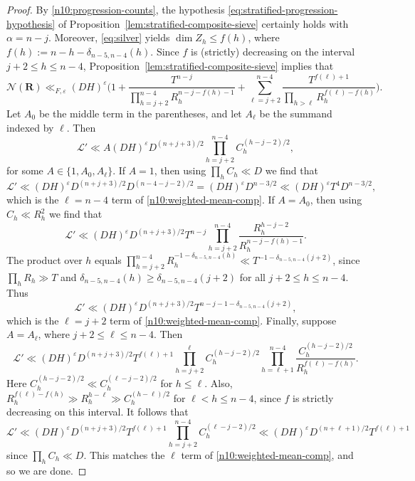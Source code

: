 \documentclass[a4paper,11pt, twoside,reqno]{amsart}
\theoremstyle{plain}
\theoremstyle{definition}
\theoremstyle{remark}
\newcommand{\ve}{\varepsilon}
\renewcommand{\le}{\leqslant}
\renewcommand{\ge}{\geqslant}
\numberwithin{equation}{section}
\begin{document}
\begin{proof}
By \eqref{n10:progression-counts},
the hypothesis \eqref{eq:stratified-progression-hypothesis}
of Proposition~\ref{lem:stratified-composite-sieve}
certainly holds with $\alpha = n-j$.
Moreover, \eqref{eq:silver} yields $\dim Z_h \le f(h)$, where $f(h) := n-h-\delta_{n-5,n-4}(h)$.
Since $f$ is (strictly) decreasing on the interval $j+2\le h\le n-4$,
Proposition~\ref{lem:stratified-composite-sieve} implies that
\[
\mathcal N(\bm R) \ll_{F,\ve}(DH)^\ve\Biggl(
1+\frac{T^{n-j}}{\prod_{h=j+2}^{n-4}R_h^{n-j-f(h)-1}}
+\sum_{\ell=j+2}^{n-4}
\frac{T^{f(\ell)+1}}
 {\prod_{h>\ell}R_h^{f(\ell)-f(h)}}
\Biggr).
\]
Let $A_0$ be the middle term in the parentheses,
and let $A_\ell$ be the summand indexed by $\ell$.
Then
\begin{equation*}
\mathcal L'
\ll A (DH)^\ve D^{(n+j+3)/2} \prod_{h=j+2}^{n-4} C_h^{(h-j-2)/2},
\end{equation*}
for some $A\in \{1, A_0, A_\ell\}$.
If $A=1$, then using $\prod_h C_h\ll D$ we find that
\begin{equation*}
\mathcal L'
\ll (DH)^\ve D^{(n+j+3)/2} D^{(n-4-j-2)/2}
= (DH)^\ve D^{n-3/2}
\ll (DH)^\ve T^4 D^{n-3/2},
\end{equation*}
which is the $\ell=n-4$ term of \eqref{n10:weighted-mean-comp}.
If $A=A_0$, then using $C_h\ll R_h^2$ we find that
\begin{equation*}
\mathcal L'
\ll (DH)^\ve D^{(n+j+3)/2} T^{n-j} \prod_{h=j+2}^{n-4}
\frac{R_h^{h-j-2}}{R_h^{n-j-f(h)-1}}.
\end{equation*}
The product over $h$ equals
$\prod_{h=j+2}^{n-4} R_h^{-1-\delta_{n-5,n-4}(h)}
\ll T^{-1-\delta_{n-5,n-4}(j+2)}$,
since $\prod_h R_h\gg T$
and $\delta_{n-5,n-4}(h) \ge \delta_{n-5,n-4}(j+2)$ for all $j+2\le h\le n-4$.
Thus
\begin{equation*}
\mathcal L'
\ll (DH)^\ve D^{(n+j+3)/2} T^{n-j-1-\delta_{n-5,n-4}(j+2)},
\end{equation*}
which is the $\ell=j+2$ term of \eqref{n10:weighted-mean-comp}.
Finally, suppose $A=A_\ell$, where $j+2\le\ell\le n-4$.
Then
\begin{equation*}
\mathcal L'
\ll (DH)^\ve D^{(n+j+3)/2} T^{f(\ell)+1}
\prod_{h=j+2}^{\ell} C_h^{(h-j-2)/2}
\prod_{h=\ell+1}^{n-4} \frac{C_h^{(h-j-2)/2}}{R_h^{f(\ell)-f(h)}}.
\end{equation*}
Here $C_h^{(h-j-2)/2} \ll C_h^{(\ell-j-2)/2}$ for $h\le \ell$.
Also, $R_h^{f(\ell)-f(h)} \gg R_h^{h-\ell} \gg C_h^{(h-\ell)/2}$ for $\ell < h\le n-4$,
since $f$ is strictly decreasing on this interval.
It follows that
\begin{equation*}
\mathcal L'
\ll (DH)^\ve D^{(n+j+3)/2} T^{f(\ell)+1}
\prod_{h=j+2}^{n-4} C_h^{(\ell-j-2)/2}
\ll (DH)^\ve D^{(n+\ell+1)/2} T^{f(\ell)+1}
\end{equation*}
since $\prod_h C_h\ll D$.
This matches the $\ell$ term of \eqref{n10:weighted-mean-comp}, and so we are done.
\end{proof}
\end{document}
